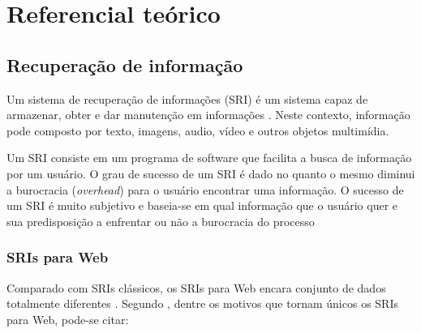 
\pagebreak
\chapter{Referencial teórico}

\pagebreak
\section{Recuperação de informação}

Um sistema de recuperação de informações (SRI) é um sistema capaz de armazenar, obter e dar manutenção em informações \cite[p. 2]{kowalski}. Neste contexto, informação pode composto por texto, imagens, audio, vídeo e outros objetos multimídia.

Um SRI consiste em um programa de software que facilita a busca de informação por um usuário. O grau de sucesso de um SRI é dado no quanto o mesmo diminui a burocracia (\emph{overhead}) para o usuário encontrar uma informação. O sucesso de um SRI é muito subjetivo e baseia-se em qual informação que o usuário quer e sua predisposição a enfrentar ou não a burocracia do processo \cite[p. 4]{kowalski}

\subsection{SRIs para Web}

Comparado com SRIs clássicos, os SRIs para Web encara conjunto de dados totalmente diferentes \cite[p. 2]{surveyir}. Segundo \cite{surveyir}, dentre os motivos que tornam únicos os SRIs para Web, pode-se citar:

